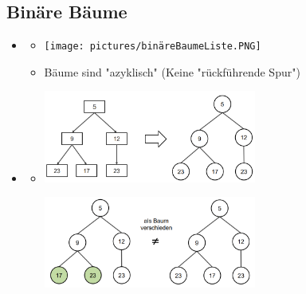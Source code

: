 \documentclass[
    12pt,
    a4paper,
    ngerman,
    color=3b,%
    marginpar=false,
    colorback=false,
    leqno,
]{tudaexercise}
\begin{document}
\subsection{Binäre Bäume}\label{Binaere Baeume}
\begin{itemize}
    \item {}
          \begin{itemize}
              \item[] \texttt{[image: pictures/binäreBaumeListe.PNG]}
              \item[] Bäume sind \string"azyklisch\string" (Keine "rückführende Spur")
          \end{itemize}

    \item {}
          \begin{itemize}
              \item[]
                    \begin{minipage}[t]{0.45\textwidth}
                        \includegraphics[width=7cm]{pictures/baumGraph1.PNG}
                    \end{minipage}
                    \begin{minipage}[t]{0.45\textwidth}
                        \includegraphics[width=7cm]{pictures/baumGraph2.PNG}
                    \end{minipage}
          \end{itemize}


\end{itemize}
\end{document}
